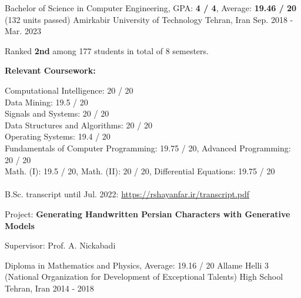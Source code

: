 

\begin{cventries}

  \cventry
    {Bachelor of Science in Computer Engineering, GPA: \textbf{4 / 4}, Average: \textbf{19.46 / 20} (132 units passed)} %
    {Amirkabir University of Technology} %
    {Tehran, Iran} %
    {Sep. 2018 - Mar. 2023} %
    {
      \begin{cvitems}
        \item{Ranked \textbf{2nd} among 177 students in total of 8 semesters.}
        \item{
          \textbf{Relevant Coursework:}
          \smallskip
          \begin{adjustwidth}{4mm}{}
            Computational Intelligence: 20 / 20 \\
	          Data Mining: 19.5 / 20 \\
          	Signals and Systems: 20 / 20 \\
          	Data Structures and Algorithms: 20 / 20 \\
          	Operating Systems: 19.4 / 20 \\
          	Fundamentals of Computer Programming: 19.75 / 20, Advanced Programming: 20 / 20 \\
          	Math. (I): 19.5 / 20, Math. (II): 20 / 20, Differential Equations: 19.75 / 20 \\
            \\[-2mm]
          	\textcolor{awesome-skyblue}{B.Sc. transcript until Jul. 2022: \href{https://rshayanfar.ir/transcript.pdf}{https://rshayanfar.ir/transcript.pdf}}
          	\medskip
          \end{adjustwidth}
        }
        \item{
          Project: \textbf{Generating Handwritten Persian Characters with Generative Models}
        }
        \item{
          Supervisor: Prof. A. Nickabadi
        }
      \end{cvitems}
    }

  \cventry
    {Diploma in Mathematics and Physics, Average: 19.16 / 20} %
    {{\fontsize{9.8pt}{1em}\bodyfont Allame Helli 3 (National Organization for Development of Exceptional Talents) High School}}
    {Tehran, Iran} %
    {2014 - 2018} %
    {}

\end{cventries}
